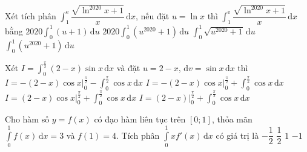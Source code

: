 \begin{ex}%
Xét tích phân $\displaystyle\int_1^\mathrm{e}\dfrac{\sqrt{\ln ^{2020} x+1}}{x} \mathrm{\,d}x$, nếu đặt $u=\ln x$ thì $\displaystyle\int_1^\mathrm{e}\dfrac{\sqrt{\ln ^{2020} x+1}}{x} \mathrm{\,d}x$ bằng
\choice
{$2020\displaystyle\int_0^1(u+1) \mathrm{\,d}u$}
{$2020\displaystyle\int_0^1(u^{2020}+1) \mathrm{\,d}u$}
{\True $\displaystyle\int_0^1\sqrt{u^{2020}+1} \mathrm{\,d}u$}
{$\displaystyle\int_0^1(u^{2020}+1) \mathrm{\,d}u$}
\end{ex}

\begin{ex}%
Xét $I=\displaystyle\int_0^{\tfrac{\pi}{2}}(2-x)\sin x \mathrm{\,d}x$ và đặt $u=2-x,  \mathrm{\,d}v=\sin x \mathrm{\,d}x$ thì
\choice
{\True $I=-(2-x)\cos x\bigg|_0^{\tfrac{\pi}{2}}-\displaystyle\int_0^{\tfrac{\pi}{2}}\cos x \mathrm{\,d}x$}
{$I=-(2-x)\cos x\bigg|_0^{\tfrac{\pi}{2}}+\displaystyle\int_0^{\tfrac{\pi}{2}}\cos x \mathrm{\,d}x$}
{$I=(2-x)\cos x\bigg|_0^{\tfrac{\pi}{2}}+\displaystyle\int_0^{\tfrac{\pi}{2}}\cos x \mathrm{\,d}x$}
{$I=(2-x)\bigg|_0^{\tfrac{\pi}{2}}+\displaystyle\int_0^{\tfrac{\pi}{2}}\cos x \mathrm{\,d}x$}
\end{ex}

\begin{ex}%
Cho hàm số $y=f(x)$ có đạo hàm liên tục trên $[0;1]$, thỏa mãn $\displaystyle\int\limits_0^1{f(x)\mathrm{\,d}x=3}$ và $f(1)=4$. Tích phân $\displaystyle\int\limits_0^1{xf'(x)\mathrm{\,d}x}$ có giá trị là
\choice
{$-\dfrac{1}{2}$}
{$\dfrac{1}{2}$}
{\True $1$}
{$-1$}
\end{ex}

